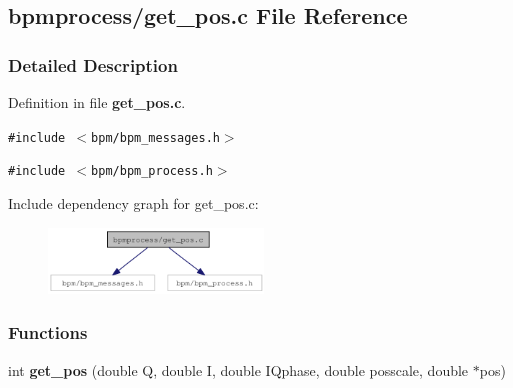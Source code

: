 \subsection{bpmprocess/get\_\-pos.c File Reference}
\label{get__pos_8c}


\subsubsection{Detailed Description}


Definition in file {\bf get\_\-pos.c}.

{\tt \#include $<$bpm/bpm\_\-messages.h$>$}\par
{\tt \#include $<$bpm/bpm\_\-process.h$>$}\par


Include dependency graph for get\_\-pos.c:\nopagebreak
\begin{figure}[H]
\begin{center}
\leavevmode
\includegraphics[width=162pt]{get__pos_8c__incl}
\end{center}
\end{figure}
\subsubsection*{Functions}
\begin{CompactItemize}
\item 
int {\bf get\_\-pos} (double Q, double I, double IQphase, double posscale, double $\ast$pos)
\end{CompactItemize}
